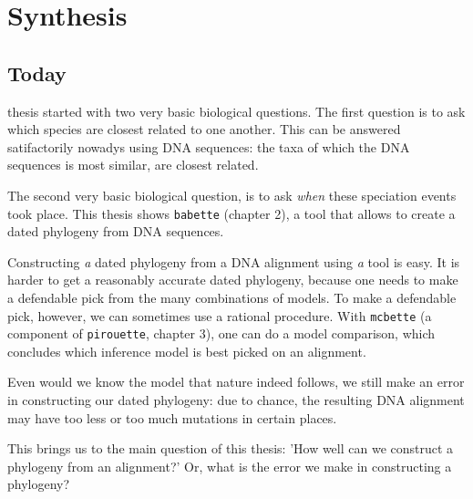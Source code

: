 \chapter{Synthesis}
\label{synthesis}

\newpage






\section{Today}

\noindent

 thesis started with two very basic biological 
questions. The first question is to ask which species are closest related to
one another. This can be answered satifactorily 
nowadys using DNA sequences: the taxa of 
which the DNA sequences is most similar, are closest related.

The second very basic biological question, is to 
ask \emph{when} these speciation events took place.
This thesis shows \verb;babette; (chapter 2), a tool that allows
to create a dated phylogeny from DNA sequences.

Constructing \emph{a} dated phylogeny from a DNA alignment 
using \emph{a} tool is easy.
It is harder to get a reasonably accurate dated phylogeny,
because one needs to make a defendable pick from the many combinations of 
models. To make a defendable pick, however, we can sometimes use
a rational procedure. With \verb;mcbette; (a component of \verb;pirouette;,
chapter 3), one can do a model
comparison, which concludes which inference model is best picked
on an alignment. 

Even would we know the model that nature indeed follows, we
still make an error in constructing our dated phylogeny: due
to chance, the resulting DNA alignment may have 
too less or too much mutations in certain places.

This brings us to the main question of this thesis:
'How well can we construct a phylogeny from an alignment?'
Or, what is the error we make in constructing a phylogeny?
 

